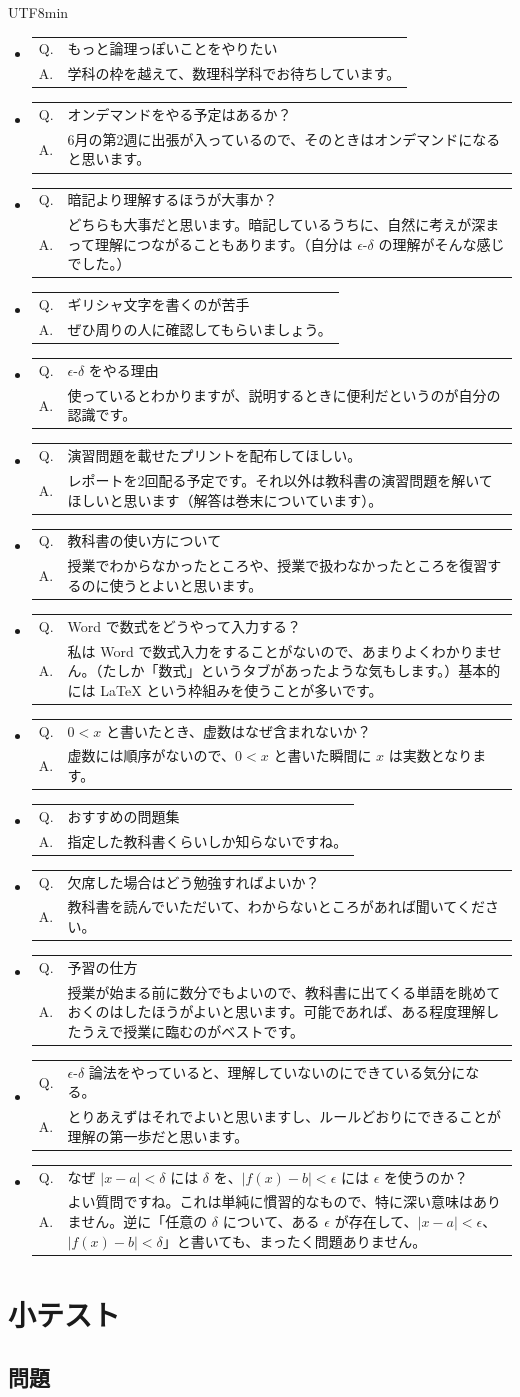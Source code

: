 \documentclass[a4paper,12pt]{article}
\makeatletter
\newcommand{\feedbackqa}[2]{%
\item[]
\begin{tabular}[t]{@{}p{1.8em}@{\hspace{0.4em}}p{\dimexpr\linewidth-2.2em\relax}@{}}
Q. & #1 \\
A. & #2
\end{tabular}
\par\smallskip\hrulefill
}
\makeatother
\begin{document}
\begin{CJK}{UTF8}{min}
\begin{itemize}[leftmargin=1.5em,itemsep=0.7em,topsep=0.3em]
\feedbackqa{もっと論理っぽいことをやりたい}{学科の枠を越えて、数理科学科でお待ちしています。}
\feedbackqa{オンデマンドをやる予定はあるか？}{6月の第2週に出張が入っているので、そのときはオンデマンドになると思います。}
\feedbackqa{暗記より理解するほうが大事か？}{どちらも大事だと思います。暗記しているうちに、自然に考えが深まって理解につながることもあります。（自分は $\epsilon$-$\delta$ の理解がそんな感じでした。）}
\feedbackqa{ギリシャ文字を書くのが苦手}{ぜひ周りの人に確認してもらいましょう。}
\feedbackqa{$\epsilon$-$\delta$ をやる理由}{使っているとわかりますが、説明するときに便利だというのが自分の認識です。}
\feedbackqa{演習問題を載せたプリントを配布してほしい。}{レポートを2回配る予定です。それ以外は教科書の演習問題を解いてほしいと思います（解答は巻末についています）。}
\feedbackqa{教科書の使い方について}{授業でわからなかったところや、授業で扱わなかったところを復習するのに使うとよいと思います。}
\feedbackqa{Word で数式をどうやって入力する？}{私は Word で数式入力をすることがないので、あまりよくわかりません。（たしか「数式」というタブがあったような気もします。）基本的には LaTeX という枠組みを使うことが多いです。}
\feedbackqa{$0<x$ と書いたとき、虚数はなぜ含まれないか？}{虚数には順序がないので、$0<x$ と書いた瞬間に $x$ は実数となります。}
\feedbackqa{おすすめの問題集}{指定した教科書くらいしか知らないですね。}
\feedbackqa{欠席した場合はどう勉強すればよいか？}{教科書を読んでいただいて、わからないところがあれば聞いてください。}
\feedbackqa{予習の仕方}{授業が始まる前に数分でもよいので、教科書に出てくる単語を眺めておくのはしたほうがよいと思います。可能であれば、ある程度理解したうえで授業に臨むのがベストです。}
\feedbackqa{$\epsilon$-$\delta$ 論法をやっていると、理解していないのにできている気分になる。}{とりあえずはそれでよいと思いますし、ルールどおりにできることが理解の第一歩だと思います。}
\feedbackqa{なぜ $|x-a|<\delta$ には $\delta$ を、$|f(x)-b|<\epsilon$ には $\epsilon$ を使うのか？}{よい質問ですね。これは単純に慣習的なもので、特に深い意味はありません。逆に「任意の $\delta$ について、ある $\epsilon$ が存在して、$|x-a|<\epsilon$、$|f(x)-b|<\delta$」と書いても、まったく問題ありません。}
\end{itemize}

\section*{小テスト}

\subsection*{問題}


\end{CJK}
\end{document}
